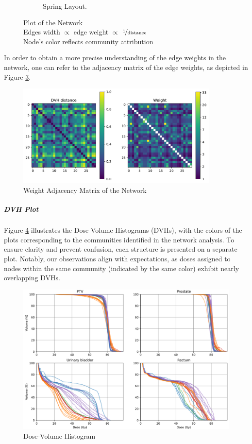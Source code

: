 \begin{figure}
\begin{subfigure}[c]{0.49\textwidth}
		\caption{Spring Layout.}
		\label{fig:graph-spring}
	\end{subfigure}
	\caption{
		Plot of the Network\\
		Edges width $\propto$ edge weight $\propto$ $\nicefrac{\text{1}}{\text{distance}}$\\
		Node's color reflects community attribution
	}
	\label{fig:graph}
\end{figure}

In order to obtain a more precise understanding of the edge weights in the network, one can refer to the adjacency matrix of the edge weights, as depicted in Figure \ref{fig:adjacency}.
\begin{figure}
	\centering
	\includegraphics[width=0.9\textwidth]{dose_clustering_figures/adjacency.pdf}
	\caption{Weight Adjacency Matrix of the Network}
	\label{fig:adjacency}
\end{figure}

\subparagraph{DVH Plot}
Figure \ref{fig:dvh} illustrates the Dose-Volume Histograms (DVHs), with the colors of the plots corresponding to the communities identified in the network analysis.
To ensure clarity and prevent confusion, each structure is presented on a separate plot.
Notably, our observations align with expectations, as doses assigned to nodes within the same community (indicated by the same color) exhibit nearly overlapping DVHs.
\begin{figure}
	\centering
	\includegraphics[width=\textwidth]{dose_clustering_figures/dvh.pdf}
	\caption{Dose-Volume Histogram}
	\label{fig:dvh}
\end{figure}

